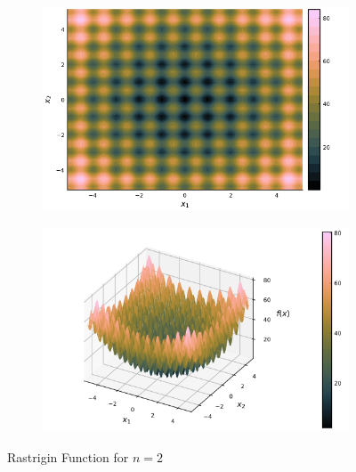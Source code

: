     \begin{figure}[ht!]
      \centering
      \begin{subfigure}[b]{0.4\textwidth}
        \centering
        \includegraphics[width=\textwidth]{img/test_functions/rastrigin_contour.png}
      \end{subfigure}
      \begin{subfigure}[b]{0.4\textwidth}
        \centering
        \includegraphics[width=\textwidth]{img/test_functions/rastrigin_surface.png}
      \end{subfigure}
      \caption{Rastrigin Function for \(n = 2\)}
      \label{fig:test_functions:rastrigin}
    \end{figure}
